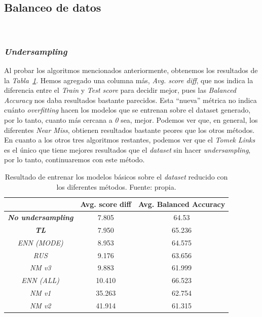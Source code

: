 \subsection{Balanceo de datos}\ \label{sec:i2-balance}

\subsubsection{\textit{Undersampling}}

Al probar los algoritmos mencionados anteriormente, obtenemos los resultados de la \textit{Tabla\ \ref{tab:undersampling-methods}}. 
Hemos agregado una columna más, \textit{Avg. score diff}, que nos indica la diferencia entre el \textit{Train} y \textit{Test score} para decidir mejor, pues las \textit{Balanced Accuracy} nos daba resultados bastante parecidos. Esta ``nueva'' métrica no indica cuánto \textit{overfitting} hacen los modelos que se entrenan sobre el dataset generado, por lo tanto, cuanto más cercana a \textit{0} sea, mejor. Podemos ver que, en general, los diferentes \textit{Near Miss}, obtienen resultados bastante peores que los otros métodos. En cuanto a los otros tres algoritmos restantes, podemos ver que el \textit{Tomek Links} es el único que tiene mejores resultados que el \textit{dataset} sin hacer \textit{undersampling}, por lo tanto, continuaremos con este método.

\begin{table}[!ht]
    \centering
    \begin{tabular}{|c|cc|} \hline
        & Avg. score diff & Avg. Balanced Accuracy \\ \hline
        \textit{\textbf{No undersampling}} & 7.805 & 64.53 \\ 
        \textit{\textbf{TL}} & 7.950 & 65.236 \\ 
        \textit{ENN (MODE)} & 8.953 & 64.575 \\ 
        \textit{RUS} & 9.176 & 63.656 \\ 
        \textit{NM v3} & 9.883 & 61.999 \\ 
        \textit{ENN (ALL)} & 10.410 & 66.523 \\ 
        \textit{NM v1} & 35.263 & 62.754 \\ 
        \textit{NM v2} & 41.914 & 61.315 \\ \hline
    \end{tabular}
    \caption{Resultado de entrenar los modelos básicos sobre el \textit{dataset} reducido con los diferentes métodos. Fuente: propia.}\ \label{tab:undersampling-methods}
\end{table}

